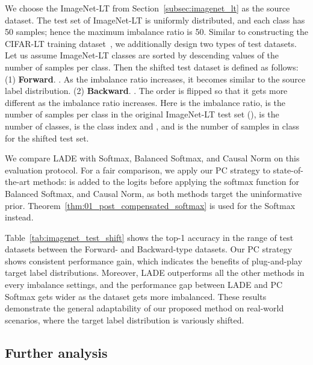 \documentclass[final]{cvpr}
\begin{document}
We choose the ImageNet-LT from Section~\ref{subsec:imagenet_lt} as the source dataset. 
The test set of ImageNet-LT is uniformly distributed, and each class has 50 samples; hence the maximum imbalance ratio is 50.
Similar to constructing the CIFAR-LT training dataset~\cite{cui2019class, cao2019learning}, we additionally design two types of test datasets. 
Let us assume ImageNet-LT classes are sorted by descending values of the number of samples per class.
Then the shifted test dataset is defined as follows:
(1) \textbf{Forward}. . As the imbalance ratio increases, it becomes similar to the source label distribution.
(2) \textbf{Backward}. . The order is flipped so that it gets more different as the imbalance ratio increases.
Here  is the imbalance ratio,  is the number of samples per class in the original ImageNet-LT test set (),  is the number of classes,  is the class index and , and  is the number of samples in class  for the shifted test set.

We compare LADE with Softmax, Balanced Softmax, and Causal Norm on this evaluation protocol.
For a fair comparison, we apply our PC strategy to state-of-the-art methods:  is added to the logits before applying the softmax function for Balanced Softmax, and Causal Norm, as both methods target the uninformative prior. 
Theorem~\ref{thm:01_post_compensated_softmax} is used for the Softmax instead.

Table~\ref{tab:imagenet_test_shift} shows the top-1 accuracy in the range of test datasets between the Forward- and Backward-type datasets.
Our PC strategy shows consistent performance gain, which indicates the benefits of plug-and-play target label distributions.
Moreover, LADE outperforms all the other methods in every imbalance settings, and the performance gap between LADE and PC Softmax gets wider as the dataset gets more imbalanced.
These results demonstrate the general adaptability of our proposed method on real-world scenarios, where the target label distribution is variously shifted.

\subsection{Further analysis}\label{subsec:4_4_further_analysis}
\end{document}
